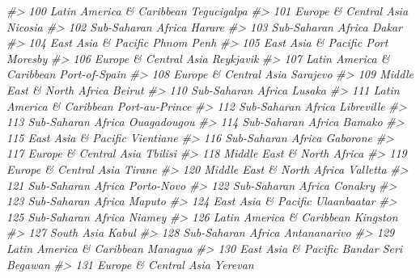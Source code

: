 \documentclass[
  xelatex, ja=standard]{bxjsbook}
\newenvironment{Shaded}{\begin{snugshade}}{\end{snugshade}}
\newcommand{\CommentTok}[1]{\textcolor[rgb]{0.56,0.35,0.01}{\textit{#1}}}
\theoremstyle{definition}
\theoremstyle{definition}
\theoremstyle{definition}
\theoremstyle{definition}
\theoremstyle{remark}
\begin{document}
\begin{Shaded}
\begin{Highlighting}[]
\CommentTok{\#\textgreater{} 100  Latin America \& Caribbean         Tegucigalpa}
\CommentTok{\#\textgreater{} 101      Europe \& Central Asia             Nicosia}
\CommentTok{\#\textgreater{} 102         Sub{-}Saharan Africa              Harare}
\CommentTok{\#\textgreater{} 103         Sub{-}Saharan Africa               Dakar}
\CommentTok{\#\textgreater{} 104        East Asia \& Pacific          Phnom Penh}
\CommentTok{\#\textgreater{} 105        East Asia \& Pacific        Port Moresby}
\CommentTok{\#\textgreater{} 106      Europe \& Central Asia           Reykjavik}
\CommentTok{\#\textgreater{} 107  Latin America \& Caribbean       Port{-}of{-}Spain}
\CommentTok{\#\textgreater{} 108      Europe \& Central Asia            Sarajevo}
\CommentTok{\#\textgreater{} 109 Middle East \& North Africa              Beirut}
\CommentTok{\#\textgreater{} 110         Sub{-}Saharan Africa              Lusaka}
\CommentTok{\#\textgreater{} 111  Latin America \& Caribbean      Port{-}au{-}Prince}
\CommentTok{\#\textgreater{} 112         Sub{-}Saharan Africa          Libreville}
\CommentTok{\#\textgreater{} 113         Sub{-}Saharan Africa         Ouagadougou}
\CommentTok{\#\textgreater{} 114         Sub{-}Saharan Africa              Bamako}
\CommentTok{\#\textgreater{} 115        East Asia \& Pacific           Vientiane}
\CommentTok{\#\textgreater{} 116         Sub{-}Saharan Africa            Gaborone}
\CommentTok{\#\textgreater{} 117      Europe \& Central Asia             Tbilisi}
\CommentTok{\#\textgreater{} 118 Middle East \& North Africa                    }
\CommentTok{\#\textgreater{} 119      Europe \& Central Asia              Tirane}
\CommentTok{\#\textgreater{} 120 Middle East \& North Africa            Valletta}
\CommentTok{\#\textgreater{} 121         Sub{-}Saharan Africa          Porto{-}Novo}
\CommentTok{\#\textgreater{} 122         Sub{-}Saharan Africa             Conakry}
\CommentTok{\#\textgreater{} 123         Sub{-}Saharan Africa              Maputo}
\CommentTok{\#\textgreater{} 124        East Asia \& Pacific         Ulaanbaatar}
\CommentTok{\#\textgreater{} 125         Sub{-}Saharan Africa              Niamey}
\CommentTok{\#\textgreater{} 126  Latin America \& Caribbean            Kingston}
\CommentTok{\#\textgreater{} 127                 South Asia               Kabul}
\CommentTok{\#\textgreater{} 128         Sub{-}Saharan Africa        Antananarivo}
\CommentTok{\#\textgreater{} 129  Latin America \& Caribbean             Managua}
\CommentTok{\#\textgreater{} 130        East Asia \& Pacific Bandar Seri Begawan}
\CommentTok{\#\textgreater{} 131      Europe \& Central Asia             Yerevan}

\end{Highlighting}
\end{Shaded}
\end{document}

